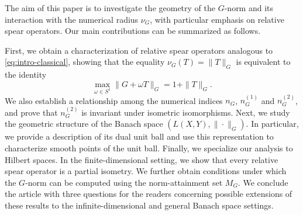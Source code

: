 \documentclass[12pt]{amsart}
\theoremstyle{definition}
\numberwithin{equation}{section}
\begin{document}
    \medskip
    
    
    The aim of this paper is to investigate the geometry of the $G$-norm and its interaction with the numerical radius $\nu_G$, with particular emphasis on relative spear operators. Our main contributions can be summarized as follows. 
    

    \medskip
    

    \noindent
    First, we obtain a characterization of relative spear operators analogous to \eqref{eq:intro-classical}, showing that the equality $\nu_G(T)=\|T\|_G$ is equivalent to the identity
    \[
    \max_{\omega\in S^1}\|G+\omega T\|_G=1+\|T\|_G.
    \]
    We also establish a relationship among the numerical indices $n_G$, $n_G^{(1)}$ and $n_G^{(2)}$, and prove that $n_G^{(2)}$ is invariant under isometric isomorphisms. Next, we study the geometric structure of the Banach space $(L(X,Y),\|\cdot\|_G)$. In particular, we provide a description of its dual unit ball and use this representation to characterize smooth points of the unit ball. Finally, we specialize our analysis to Hilbert spaces. In the finite-dimensional setting, we show that every relative spear operator is a partial isometry. We further obtain conditions under which the $G$-norm can be computed using the norm-attainment set $M_G$. We conclude the article with three questions for the readers concerning possible extensions of these results to the infinite-dimensional and general Banach space settings.
	
	
\end{document}
